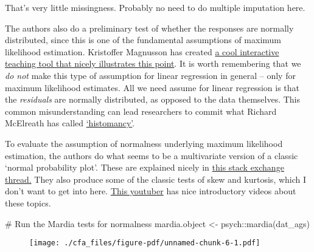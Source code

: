 \documentclass[
  letterpaper,
  DIV=11,
  numbers=noendperiod]{scrreprt}
\newenvironment{Shaded}{\begin{snugshade}}{\end{snugshade}}
\newcommand{\CommentTok}[1]{\textcolor[rgb]{0.37,0.37,0.37}{#1}}
\newcommand{\FunctionTok}[1]{\textcolor[rgb]{0.28,0.35,0.67}{#1}}
\newcommand{\NormalTok}[1]{\textcolor[rgb]{0.00,0.23,0.31}{#1}}
\newcommand{\OtherTok}[1]{\textcolor[rgb]{0.00,0.23,0.31}{#1}}
\newcommand{\SpecialCharTok}[1]{\textcolor[rgb]{0.37,0.37,0.37}{#1}}
\begin{document}
That's very little missingness. Probably no need to do multiple
imputation here.

The authors also do a preliminary test of whether the responses are
normally distributed, since this is one of the fundamental assumptions
of maximum likelihood estimation. Kristoffer Magnusson has created
\href{https://rpsychologist.com/likelihood/}{a cool interactive teaching
tool that nicely illustrates this point}. It is worth remembering that
we \emph{do not} make this type of assumption for linear regression in
general -- only for maximum likelihood estimates. All we need assume for
linear regression is that the \emph{residuals} are normally distributed,
as opposed to the data themselves. This common misunderstanding can lead
researchers to commit what Richard McElreath has called
\href{https://stats.stackexchange.com/questions/515444/histomancy-what-does-mcelreath-propose-we-do-instead}{`histomancy'}.

To evaluate the assumption of normalness underlying maximum likelihood
estimation, the authors do what seems to be a multivariate version of a
classic `normal probability plot'. These are explained nicely in
\href{https://stats.stackexchange.com/questions/218638/understanding-normal-probability-plots}{this
stack exchange thread.} They also produce some of the classic tests of
skew and kurtosis, which I don't want to get into here.
\href{https://www.youtube.com/watch?v=TM033GCU-SY\&t=26s}{This youtuber}
has nice introductory videos about these topics.

\begin{Shaded}
\begin{Highlighting}[]
\CommentTok{\# Run the Mardia tests for normalness}
\NormalTok{mardia.object }\OtherTok{\textless{}{-}}\NormalTok{ psych}\SpecialCharTok{::}\FunctionTok{mardia}\NormalTok{(dat\_ags)}
\end{Highlighting}
\end{Shaded}

\begin{figure}[H]

{\centering \texttt{[image: ./cfa\_files/figure-pdf/unnamed-chunk-6-1.pdf]}

}

\end{figure}
\end{document}
